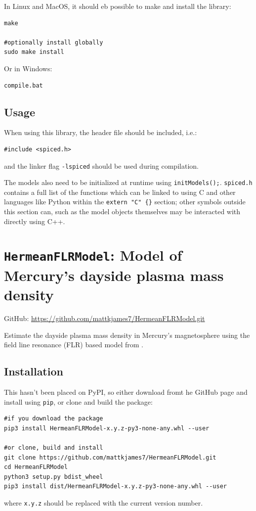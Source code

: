			In Linux and MacOS, it should eb possible to make and install the library:
			\begin{verbatim}
make

#optionally install globally
sudo make install
			\end{verbatim}

			Or in Windows:
			\begin{verbatim}
compile.bat
			\end{verbatim}

		\subsection{Usage}

			When using this library, the header file should be included, i.e.:
			\begin{verbatim}
#include <spiced.h>
			\end{verbatim}
			and the linker flag \texttt{-lspiced} should be used during compilation.

			The models also need to be initialized at runtime using \texttt{initModels();}. \texttt{spiced.h} contains a full list of the functions which can be linked to using C and other languages like Python within the \texttt{extern "C" \{\}} section; other symbols outside this section can, such as the model objects themselves may be interacted with directly using C++.

	\section{\texttt{HermeanFLRModel}: Model of Mercury's dayside plasma mass density}

		GitHub: \href{https://github.com/mattkjames7/HermeanFLRModel.git}{https://github.com/mattkjames7/HermeanFLRModel.git}

		Estimate the dayside plasma mass density in Mercury's magnetosphere using the field line resonance (FLR) based model from \citet{James2019}.

		\subsection{Installation}

			This hasn't been placed on PyPI, so either download fromt he GitHub page and install using \texttt{pip}, or clone and build the package:
			\begin{verbatim}
#if you download the package
pip3 install HermeanFLRModel-x.y.z-py3-none-any.whl --user

#or clone, build and install
git clone https://github.com/mattkjames7/HermeanFLRModel.git
cd HermeanFLRModel
python3 setup.py bdist_wheel
pip3 install dist/HermeanFLRModel-x.y.z-py3-none-any.whl --user
			\end{verbatim}
			where \texttt{x.y.z} should be replaced with the current version number.

